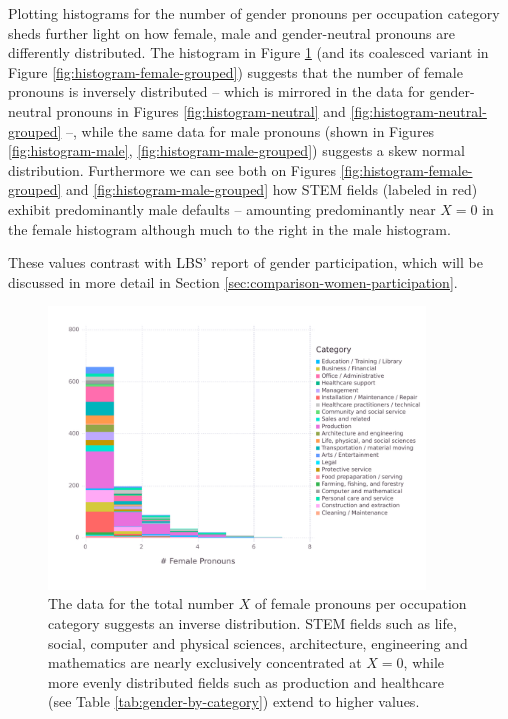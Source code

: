 \documentclass[fleqn,10pt]{article}
\begin{document}
Plotting histograms for the number of gender pronouns per occupation category sheds further light on how female, male and gender-neutral pronouns are differently distributed. The histogram in Figure \ref{fig:histogram-female} (and its coalesced variant in Figure \ref{fig:histogram-female-grouped}) suggests that the number of female pronouns is inversely distributed -- which is mirrored in the data for gender-neutral pronouns in Figures \ref{fig:histogram-neutral} and \ref{fig:histogram-neutral-grouped} --, while the same data for male pronouns (shown in Figures \ref{fig:histogram-male}, \ref{fig:histogram-male-grouped}) suggests a skew normal distribution. Furthermore we can see both on Figures \ref{fig:histogram-female-grouped} and \ref{fig:histogram-male-grouped} how STEM fields (labeled in red) exhibit predominantly male defaults -- amounting predominantly near $X = 0$ in the female histogram although much to the right in the male histogram.

These values contrast with LBS' report of gender participation, which will be discussed in more detail in Section \ref{sec:comparison-women-participation}.

\begin{figure}[H]
	\centering
	\includegraphics[width=10cm]{pictures/histogram-female}
	\caption{The data for the total number $X$ of female pronouns per occupation category suggests an inverse distribution. STEM fields such as life, social, computer and physical sciences, architecture, engineering and mathematics are nearly exclusively concentrated at $X=0$, while more evenly distributed fields such as production and healthcare (see Table \ref{tab:gender-by-category}) extend to higher values.}
	\label{fig:histogram-female}
\end{figure}
\end{document}
